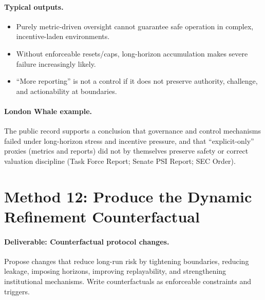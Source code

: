 \paragraph{Typical outputs.}
\begin{itemize}
  \item Purely metric-driven oversight cannot guarantee safe operation in complex, incentive-laden environments.
  \item Without enforceable resets/caps, long-horizon accumulation makes severe failure increasingly likely.
  \item “More reporting” is not a control if it does not preserve authority, challenge, and actionability at boundaries.
\end{itemize}

\paragraph{London Whale example.}
The public record supports a conclusion that governance and control mechanisms failed under long-horizon stress and incentive pressure,
and that “explicit-only” proxies (metrics and reports) did not by themselves preserve safety or correct valuation discipline
(Task Force Report; Senate PSI Report; SEC Order).

\section{Method 12: Produce the Dynamic Refinement Counterfactual}
\label{sec:m12-counterfactual}

\paragraph{Deliverable: Counterfactual protocol changes.}
Propose changes that reduce long-run risk by tightening boundaries, reducing leakage, imposing horizons, improving replayability,
and strengthening institutional mechanisms. Write counterfactuals as enforceable constraints and triggers.

